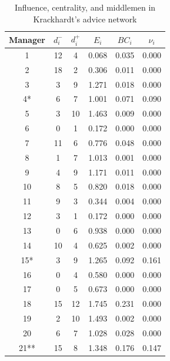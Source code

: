 \begin{table}[h]
\begin{center}
\begin{tabular}{cccccc}
\hline \hline
Manager       & $d^-_i$ & $d^+_i$& $E_i$    & $BC_i$   & $\nu_i$      \\
\hline
1             & 12 & 4           & 0.068    & 0.035    & 0.000 \\
2             & 18 & 2           & 0.306    & 0.011    & 0.000 \\
3             & 3 & 9            & 1.271    & 0.018    & 0.000 \\
4*          & 6 & 7            & 1.001    & 0.071    & 0.090 \\
5             & 3 & 10           & 1.463    & 0.009    & 0.000 \\
6             & 0 & 1            & 0.172    & 0.000    & 0.000 \\
7             & 11 & 6           & 0.776    & 0.048    & 0.000 \\
8             & 1 & 7            & 1.013    & 0.001    & 0.000 \\
9             & 4 & 9            & 1.171    & 0.011    & 0.000 \\
10            & 8 & 5            & 0.820    & 0.018    & 0.000 \\
11            & 9 & 3            & 0.344    & 0.004    & 0.000 \\
12            & 3 & 1            & 0.172    & 0.000    & 0.000 \\
13            & 0 & 6            & 0.938    & 0.000    & 0.000 \\
14            & 10 & 4           & 0.625    & 0.002    & 0.000 \\
15*         & 3 & 9            & 1.265    & 0.092    & 0.161 \\
16            & 0 & 4            & 0.580    & 0.000    & 0.000 \\
17            & 0 & 5            & 0.673    & 0.000    & 0.000 \\
18            & 15 & 12          & 1.745    & 0.231    & 0.000 \\
19            & 2 & 10           & 1.493    & 0.002    & 0.000 \\
20            & 6 & 7            & 1.028    & 0.028    & 0.000 \\
21**        & 15 & 8           & 1.348    & 0.176    & 0.147 \\
\hline \hline
\end{tabular}
\caption{Influence, centrality, and middlemen in Krackhardt's advice network}
\label{tabkrackhardt}
\end{center}
\end{table}

